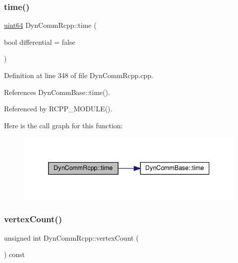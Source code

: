 \subsubsection{\texorpdfstring{time()}{time()}}
{\footnotesize\ttfamily \hyperlink{systemDefines_8h_abc0f5bc07737e498f287334775dff2b6}{uint64} Dyn\+Comm\+Rcpp\+::time (\begin{DoxyParamCaption}\item[{bool}]{differential = {\ttfamily false} }\end{DoxyParamCaption})\hspace{0.3cm}{\ttfamily [inline]}}



Definition at line 348 of file Dyn\+Comm\+Rcpp.\+cpp.



References Dyn\+Comm\+Base\+::time().



Referenced by R\+C\+P\+P\+\_\+\+M\+O\+D\+U\+L\+E().

Here is the call graph for this function\+:
\nopagebreak
\begin{figure}[H]
\begin{center}
\leavevmode
\includegraphics[width=339pt]{classDynCommRcpp_a89773080b66fd210a7e22234ba04a19f_cgraph}
\end{center}
\end{figure}
\mbox{\label{classDynCommRcpp_af7bc0e9dc9a2c1e232b3e28b63388629}} 
\subsubsection{\texorpdfstring{vertex\+Count()}{vertexCount()}}
{\footnotesize\ttfamily unsigned int Dyn\+Comm\+Rcpp\+::vertex\+Count (\begin{DoxyParamCaption}{ }\end{DoxyParamCaption}) const\hspace{0.3cm}{\ttfamily [inline]}}



